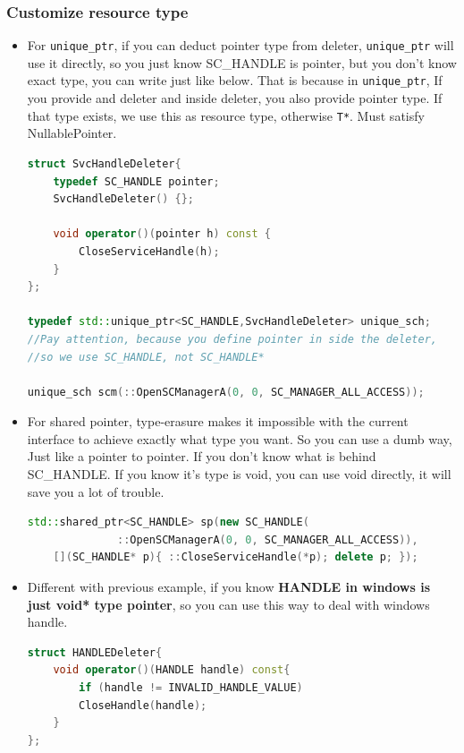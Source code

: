 \documentclass[a4paper,11pt,twoside]{book}
\begin{document}
\subsubsection{Customize resource type}
\begin{itemize}
		\item For \texttt{unique\_ptr}, if you can deduct pointer type from deleter, \texttt{unique\_ptr} will use it directly, so you just know SC\_HANDLE is pointer, but you don't know exact type, you can write just like below.  That is because in \texttt{unique\_ptr}, If you provide and deleter and inside deleter, you also provide pointer type. If that type exists, we use this as resource type, otherwise \texttt{T*}. Must satisfy NullablePointer.

\begin{lstlisting}[frame=single, language=c++]
struct SvcHandleDeleter{
	typedef SC_HANDLE pointer;
	SvcHandleDeleter() {};
	
	void operator()(pointer h) const {
		CloseServiceHandle(h);
	}
};
	
typedef std::unique_ptr<SC_HANDLE,SvcHandleDeleter> unique_sch;
//Pay attention, because you define pointer in side the deleter, 
//so we use SC_HANDLE, not SC_HANDLE* 
	
unique_sch scm(::OpenSCManagerA(0, 0, SC_MANAGER_ALL_ACCESS));
\end{lstlisting}
	
	\item For shared pointer, type-erasure makes it impossible with the current interface to achieve exactly what type you want. So you can use a dumb way, Just like a pointer to pointer. If you don't know what is behind SC\_HANDLE. If you know it's type is void, you can use void directly, it will save you a lot of trouble. 
	
\begin{lstlisting}[frame=single, language=c++]
std::shared_ptr<SC_HANDLE> sp(new SC_HANDLE(
              ::OpenSCManagerA(0, 0, SC_MANAGER_ALL_ACCESS)),
	[](SC_HANDLE* p){ ::CloseServiceHandle(*p); delete p; });
\end{lstlisting}

		\item Different with previous example, if you know \textbf{HANDLE in windows is just void* type pointer}, so you can use this way to deal with windows handle.
	
\begin{lstlisting}[frame=single, language=c++]
struct HANDLEDeleter{
	void operator()(HANDLE handle) const{
		if (handle != INVALID_HANDLE_VALUE)
		CloseHandle(handle);
	}
};
	

\end{lstlisting}
\end{itemize}
\end{document}
